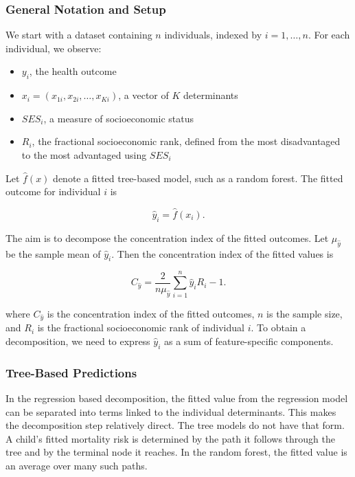 \documentclass[
  11pt,
  a4paper,
]{article}
\providecommand{\tightlist}{%
  \setlength{\itemsep}{0pt}\setlength{\parskip}{0pt}}
\begin{document}
\subsubsection{General Notation and Setup}\label{sec-decomp-setup}

We start with a dataset containing \(n\) individuals, indexed by
\(i = 1, \dots, n\). For each individual, we observe:

\begin{itemize}
\tightlist
\item
  \(y_i\), the health outcome
\item
  \(x_i = (x_{1i}, x_{2i}, \dots, x_{Ki})\), a vector of \(K\)
  determinants
\item
  \(SES_i\), a measure of socioeconomic status
\item
  \(R_i\), the fractional socioeconomic rank, defined from the most
  disadvantaged to the most advantaged using \(SES_i\)
\end{itemize}

Let \(\hat{f}(x)\) denote a fitted tree-based model, such as a random
forest. The fitted outcome for individual \(i\) is

\[
\hat{y}_i = \hat{f}(x_i).
\]

The aim is to decompose the concentration index of the fitted outcomes.
Let \(\mu_{\hat{y}}\) be the sample mean of \(\hat{y}_i\). Then the
concentration index of the fitted values is

\[
C_{\hat{y}} = \frac{2}{n\mu_{\hat{y}}}\sum_{i=1}^{n} \hat{y}_i R_i - 1.
\]

where \(C_{\hat{y}}\) is the concentration index of the fitted outcomes,
\(n\) is the sample size, and \(R_i\) is the fractional socioeconomic
rank of individual \(i\). To obtain a decomposition, we need to express
\(\hat{y}_i\) as a sum of feature-specific components.

\subsubsection{Tree-Based Predictions}\label{sec-tree-predictions}

In the regression based decomposition, the fitted value from the
regression model can be separated into terms linked to the individual
determinants. This makes the decomposition step relatively direct. The
tree models do not have that form. A child's fitted mortality risk is
determined by the path it follows through the tree and by the terminal
node it reaches. In the random forest, the fitted value is an average
over many such paths.
\end{document}
